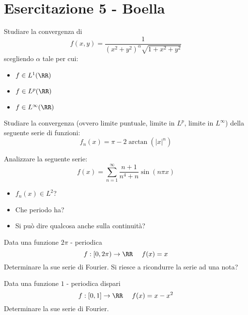 \chapter{Esercitazione 5 - Boella}

\ParteEsercizi

\Esercizio{}

Studiare la convergenza di
\begin{equation*}
f(x, y) = \frac{1}{(x^{2} + y^{2})^{\alpha}\sqrt{1 + x^{2} + y^{2}}}
\end{equation*}
scegliendo $\alpha $ tale per cui:
\begin{itemize}
\item $f\in L^{1} (\RR)$
\item $f\in L^{p} (\RR)$
\item $f\in L^{\infty} (\RR)$
\end{itemize}

\Esercizio{}

Studiare la convergenza (ovvero limite puntuale, limite in $L^{p}$, limite in $L^{\infty}$) della seguente serie di funzioni:
\begin{equation*}
f_{n} (x) = \pi - 2\arctan (|x|^{n})
\end{equation*}

\Esercizio{}

Analizzare la seguente serie:
\begin{equation*}
f(x) = \sum^{\infty}_{n = 1}\frac{n + 1}{n^{4} + n}\sin (n\pi x)
\end{equation*}
\begin{itemize}
\item $f_{n} (x)\in L^{2}$?
\item Che periodo ha?
\item Si può dire qualcosa anche sulla continuità?
\end{itemize}

\Esercizio{}

Data una funzione $2\pi $ - periodica
\begin{equation*}
f:[ 0, 2\pi)\rightarrow \RR \ \ \ \ f(x) = x
\end{equation*}
Determinare la sue serie di Fourier. Si riesce a ricondurre la serie ad una nota?

\Esercizio{}

Data una funzione $1$ - periodica dispari
\begin{equation*}
f:[ 0, 1]\rightarrow \RR \ \ \ \ f(x) = x - x^{2}
\end{equation*}
Determinare la sue serie di Fourier.

